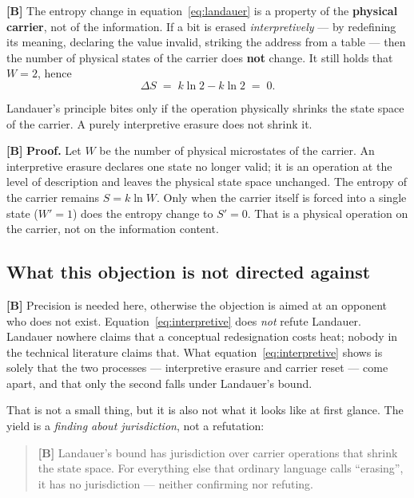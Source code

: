 \textbf{[B]} The entropy change in equation~\eqref{eq:landauer} is a property of the
\textbf{physical carrier}, not of the information. If a bit is erased
\emph{interpretively} --- by redefining its meaning, declaring the value invalid,
striking the address from a table --- then the number of physical states of the
carrier does \textbf{not} change. It still holds that $W = 2$, hence
\begin{equation}
  \Delta S \;=\; k \ln 2 - k \ln 2 \;=\; 0 .
  \label{eq:interpretive}
\end{equation}

\begin{theorem}
Landauer's principle bites only if the operation physically shrinks the state
space of the carrier. A purely interpretive erasure does not shrink it.
\end{theorem}

\textbf{[B]} \textbf{Proof.} Let $W$ be the number of physical microstates of the carrier.
An interpretive erasure declares one state no longer valid; it is an operation at
the level of description and leaves the physical state space unchanged. The
entropy of the carrier remains $S = k\ln W$. Only when the carrier itself is
forced into a single state ($W' = 1$) does the entropy change to $S' = 0$. That is
a physical operation on the carrier, not on the information content.
\hfill\qedsq

\subsection{What this objection is not directed against}
\label{sec:jurisdiction}

\textbf{[B]} Precision is needed here, otherwise the objection is aimed at an opponent who
does not exist. Equation~\eqref{eq:interpretive} does \emph{not} refute Landauer.
Landauer nowhere claims that a conceptual redesignation costs heat; nobody in the
technical literature claims that. What
equation~\eqref{eq:interpretive} shows is solely that the two processes ---
interpretive erasure and carrier reset --- come apart, and that only the second
falls under Landauer's bound.

That is not a small thing, but it is also not what it looks like at first glance.
The yield is a \emph{finding about jurisdiction}, not a refutation:

\begin{quote}
\textbf{[B]} Landauer's bound has jurisdiction over carrier operations that shrink the
state space. For everything else that ordinary language calls “erasing”, it has no
jurisdiction --- neither confirming nor refuting.
\end{quote}

